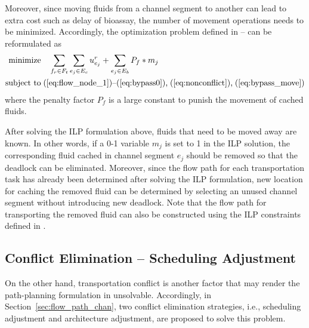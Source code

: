 Moreover, since moving fluids from a channel segment to another can lead to extra cost such as delay of bioassay, the number of movement operations needs to be minimized. Accordingly, the optimization problem defined in \text{(\ref{eq:ILP_flow_paths})}--\text{(\ref{eq:ILP_flow_paths_last})} can be reformulated as
\begin{align}\label{eq:ILP_flow_paths_deadlock}
\text{minimize} & \quad \sum_{f_r\in F_t} \sum_{e_j\in E_c} u^r_{e_j}
+ \sum_{e_j \in E_b} P_f * m_j \\\label{eq:ILP_flow_paths_deadlock_last}
\text{subject to} & \;
\text{(\ref{eq:flow_node_1})--(\ref{eq:bypass0}),\;(\ref{eq:nonconflict}),\;(\ref{eq:bypass_move})}
\end{align}
where the penalty factor $P_f$ is a large constant to punish the movement of cached fluids.

After solving the ILP formulation above, fluids that need to be moved away are known. In other words, if a 0-1 variable $m_j$ is set to 1 in the ILP solution, the corresponding fluid cached in channel segment $e_j$ should be removed so that the deadlock can be eliminated. Moreover, since the flow path for each transportation task has already been determined after solving the ILP formulation, new location for caching the removed fluid can be determined by selecting an unused channel segment without introducing new deadlock. Note that the flow path for transporting the removed fluid can also be constructed using the ILP constraints defined in \text{(\ref{eq:flow_node_1})--(\ref{eq:nonconflict})}.


\subsection{Conflict Elimination -- Scheduling Adjustment}\label{sec:ILP_flow_paths}

On the other hand, transportation conflict is another factor that may render the path-planning formulation in \text{(\ref{eq:ILP_flow_paths})--(\ref{eq:ILP_flow_paths_last})} unsolvable. Accordingly, in Section~\ref{sec:flow_path_chan}, two conflict elimination strategies, i.e., scheduling adjustment and architecture adjustment, are proposed to solve this problem.


